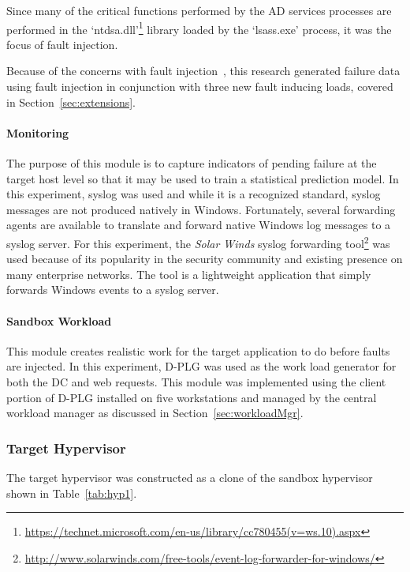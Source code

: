 \tabWSWFITFaults

Since many of the critical functions performed by the \ac{AD} services
processes are performed in the
`ntdsa.dll'\footnote{\url{https://technet.microsoft.com/en-us/library/cc780455(v=ws.10).aspx}}
library loaded by the `lsass.exe' process, it was the focus of fault injection.

Because of the concerns with fault
injection~\citep{cotroneo2012,kikuchi2014,natella2010,natella2016assessing},
this research generated failure data using fault injection in conjunction with
three new fault inducing loads, covered in Section~\ref{sec:extensions}.

\paragraph{Monitoring} \label{sec:sandboxMonitoringTool} 
The purpose of this module is to capture indicators of pending failure at the
target host level so that it may be used to train a statistical prediction
model.  In this experiment, syslog was used and while it is a recognized
standard, syslog messages are not produced natively in Windows.  Fortunately,
several forwarding agents are available to translate and forward native Windows
log messages to a syslog server.  For this experiment, the \emph{Solar Winds}
syslog forwarding
tool\footnote{\url{http://www.solarwinds.com/free-tools/event-log-forwarder-for-windows/}}
was used because of its popularity in the security community and existing
presence on many enterprise networks.  The tool is a lightweight application
that simply forwards Windows events to a syslog server.

\paragraph{Sandbox Workload}  \label{sec:sandboxWorkload} 
This module creates realistic work for the target application to do before
faults are injected.  In this experiment, \ac{D-PLG} was used as the work load
generator for both the \ac{DC} and web requests.  This module was implemented
using the client portion of \ac{D-PLG} installed on five workstations and
managed by the central workload manager as discussed in
Section~\ref{sec:workloadMgr}.

\subsubsection{Target Hypervisor} \label{sec:target}
The target hypervisor was constructed as a clone of the sandbox hypervisor
shown in Table~\ref{tab:hyp1}. 


